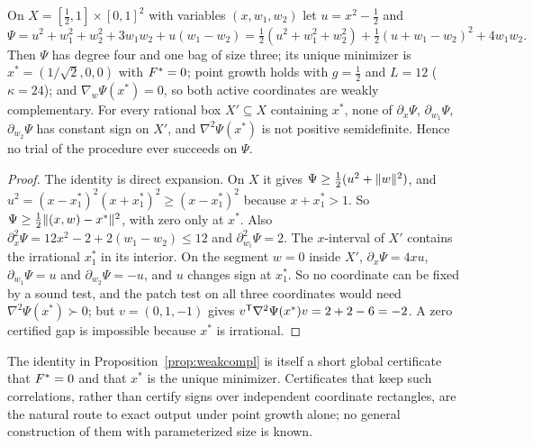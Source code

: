 \begin{proposition}\label{prop:weakcompl}
On $X=[\frac12,1]\times[0,1]^2$ with variables $(x,w_1,w_2)$ let
$u=x^2-\frac12$ and
\[
\Psi=u^2+w_1^2+w_2^2+3w_1w_2+u(w_1-w_2)
=\tfrac12(u^2+w_1^2+w_2^2)+\tfrac12(u+w_1-w_2)^2+4w_1w_2 .
\]
Then $\Psi$ has degree four and one bag of size three; its unique minimizer
is $x^*=(1/\sqrt2,0,0)$ with $F^{*}=0$; point growth holds with $g=\frac12$ and
$L=12$ ($\kappa=24$); and $\nabla_w\Psi(x^*)=0$, so both active coordinates
are weakly complementary. For every rational box $X'\subseteq X$ containing
$x^*$, none of $\partial_x\Psi$, $\partial_{w_1}\Psi$, $\partial_{w_2}\Psi$ has
constant sign on $X'$, and $\nabla^2\Psi(x^*)$ is not positive semidefinite.
Hence no trial of the procedure ever succeeds on $\Psi$.
\end{proposition}

\begin{proof}
The identity is direct expansion. On $X$ it gives
$\Psi\ge\frac12(u^2+\lVert w\rVert^2)$, and
$u^2=(x-x^*_1)^2(x+x^*_1)^2\ge(x-x^*_1)^2$ because $x+x^*_1>1$. So
$\Psi\ge\frac12\lVert (x,w)-x^*\rVert^2$, with zero only at $x^*$. Also
$\partial_x^2\Psi=12x^2-2+2(w_1-w_2)\le12$ and $\partial_{w_i}^2\Psi=2$. The
$x$-interval of $X'$ contains the irrational $x^*_1$ in its interior. On the
segment $w=0$ inside $X'$, $\partial_x\Psi=4xu$, $\partial_{w_1}\Psi=u$ and
$\partial_{w_2}\Psi=-u$, and $u$ changes sign at $x^*_1$. So no coordinate can
be fixed by a sound test, and the patch test on all three coordinates would
need $\nabla^2\Psi(x^*)\succ0$; but $v=(0,1,-1)$ gives
$v^{\mathsf T}\nabla^2\Psi(x^*)v=2+2-6=-2$. A zero certified gap is impossible
because $x^*$ is irrational.
\end{proof}

The identity in Proposition~\ref{prop:weakcompl} is itself a short global
certificate that $F^{*}=0$ and that $x^*$ is the unique minimizer.
Certificates that keep such correlations, rather than certify signs over
independent coordinate rectangles, are the natural route to exact output
under point growth alone; no general construction of them with parameterized
size is known.
